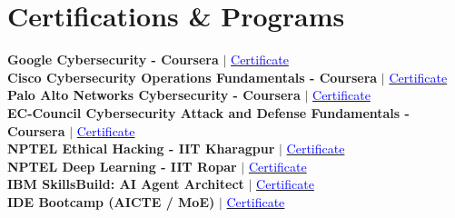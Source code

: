 \documentclass[letterpaper,11pt]{article}
\begin{document}
\section{Certifications \& Programs}
 \begin{itemize}[leftmargin=0.15in, label={}]
    \footnotesize{\item{
     \textbf{Google Cybersecurity - Coursera} $|$ \href{https://drive.google.com/file/d/1SIxLO0PLcOsLC0SQkZri6dQD1kyKAooL/view?usp=sharing}{\textcolor{blue}{Certificate}} \\[2pt]
     \textbf{Cisco Cybersecurity Operations Fundamentals - Coursera} $|$ \href{https://drive.google.com/file/d/1GzR6t8wylBR3NqwdkuLobi6jAqEr0CcG/view?usp=sharing}{\textcolor{blue}{Certificate}} \\[2pt]
     \textbf{Palo Alto Networks Cybersecurity - Coursera} $|$ \href{https://drive.google.com/file/d/1ArLaJyIQP2R-S94KwshJRTgIQdjc3UCm/view?usp=sharing}{\textcolor{blue}{Certificate}} \\[2pt]
     \textbf{EC-Council Cybersecurity Attack and Defense Fundamentals - Coursera} $|$ \href{https://drive.google.com/file/d/1JpG9iwP2Sq4JCl01PF6VVTFD9B1ZZT4M/view?usp=sharing}{\textcolor{blue}{Certificate}} \\[2pt]
     \textbf{NPTEL Ethical Hacking - IIT Kharagpur} $|$ \href{https://archive.nptel.ac.in/content/noc/NOC24/SEM2/Ecertificates/106/noc24-cs94/Course/NPTEL24CS94S35440004903810809.pdf}{\textcolor{blue}{Certificate}} \\[2pt]
     \textbf{NPTEL Deep Learning - IIT Ropar} $|$ \href{https://archive.nptel.ac.in/content/noc/NOC25/SEM2/Ecertificates/106/noc25-cs106/Course/NPTEL25CS106S45890051510210361.pdf}{\textcolor{blue}{Certificate}} \\[2pt]
     \textbf{IBM SkillsBuild: AI Agent Architect} $|$ \href{https://drive.google.com/file/d/19Pmeutg62bbuCQ1M5NDx4nc2zKQgZ2ig/view}{\textcolor{blue}{Certificate}} \\[2pt]
     \textbf{IDE Bootcamp (AICTE / MoE)} $|$ \href{https://drive.google.com/file/d/1zPWEANVHF5TArUIdF3m7mu7goTPxbUPX/view?usp=sharing}{\textcolor{blue}{Certificate}}
    }}
 \end{itemize}
\end{document}
